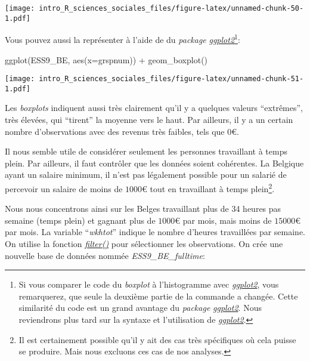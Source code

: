 \documentclass[
]{book}
\newenvironment{Shaded}{\begin{snugshade}}{\end{snugshade}}
\newcommand{\AttributeTok}[1]{\textcolor[rgb]{0.77,0.63,0.00}{#1}}
\newcommand{\FunctionTok}[1]{\textcolor[rgb]{0.00,0.00,0.00}{#1}}
\newcommand{\NormalTok}[1]{#1}
\newcommand{\SpecialCharTok}[1]{\textcolor[rgb]{0.00,0.00,0.00}{#1}}
\begin{document}
\texttt{[image: intro\_R\_sciences\_sociales\_files/figure-latex/unnamed-chunk-50-1.pdf]}

Vous pouvez aussi la représenter à l'aide de du \emph{package} \href{https://ggplot2.tidyverse.org/}{\emph{ggplot2}}\footnote{Si vous comparer le code du \emph{boxplot} à l'histogramme avec \href{https://ggplot2.tidyverse.org/}{\emph{ggplot2}}, vous remarquerez, que seule la deuxième partie de la commande a changée. Cette similarité du code est un grand avantage du \emph{package} \href{https://ggplot2.tidyverse.org/}{\emph{ggplot2}}. Nous reviendrons plus tard sur la syntaxe et l'utilisation de \href{https://ggplot2.tidyverse.org/}{\emph{ggplot2}}.}:

\begin{Shaded}
\begin{Highlighting}[]
\FunctionTok{ggplot}\NormalTok{(ESS9\_BE, }\FunctionTok{aes}\NormalTok{(}\AttributeTok{x=}\NormalTok{grspnum)) }\SpecialCharTok{+}
  \FunctionTok{geom\_boxplot}\NormalTok{()}
\end{Highlighting}
\end{Shaded}

\texttt{[image: intro\_R\_sciences\_sociales\_files/figure-latex/unnamed-chunk-51-1.pdf]}

Les \emph{boxplots} indiquent aussi très clairement qu'il y a quelques valeurs ``extrêmes'', très élevées, qui ``tirent'' la moyenne vers le haut. Par ailleurs, il y a un certain nombre d'observations avec des revenus très faibles, tels que \(0€\).

Il nous semble utile de considérer seulement les personnes travaillant à temps plein. Par ailleurs, il faut contrôler que les données soient cohérentes. La Belgique ayant un salaire minimum, il n'est pas légalement possible pour un salarié de percevoir un salaire de moins de \(1000€\) tout en travaillant à temps plein\footnote{Il est certainement possible qu'il y ait des cas très spécifiques où cela puisse se produire. Mais nous excluons ces cas de nos analyses.}.

Nous nous concentrons ainsi sur les Belges travaillant plus de 34 heures pas semaine (temps plein) et gagnant plus de \(1000€\) par mois, mais moins de \(15000€\) par mois. La variable ``\emph{wkhtot}'' indique le nombre d'heures travaillées par semaine. On utilise la fonction \href{https://dplyr.tidyverse.org/reference/filter.html}{\emph{filter()}} pour sélectionner les observations. On crée une nouvelle base de données nommée \emph{ESS9\_BE\_fulltime}:
\end{document}

